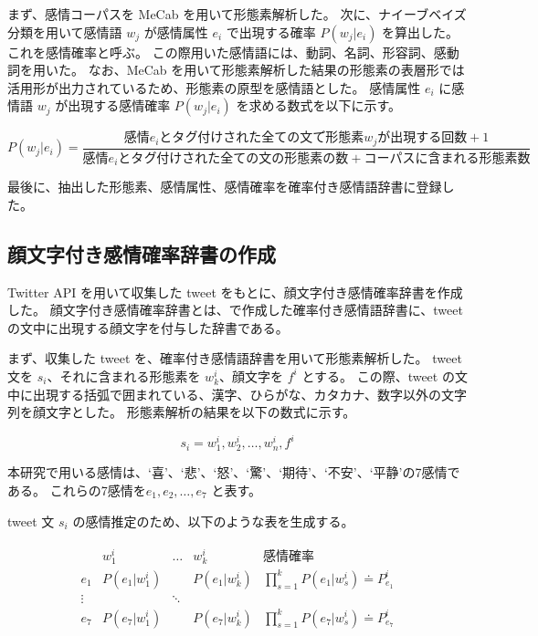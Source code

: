 \documentclass[11pt,a4j]{jsarticle}
\begin{document}
まず、感情コーパスを MeCab を用いて形態素解析した。
次に、ナイーブベイズ分類を用いて感情語 $w_j$ が感情属性 $e_i$ で出現する確率 $P(w_j|e_i)$ を算出した。
これを感情確率と呼ぶ。
この際用いた感情語には、動詞、名詞、形容詞、感動詞を用いた。
なお、MeCab を用いて形態素解析した結果の形態素の表層形では活用形が出力されているため、形態素の原型を感情語とした。
感情属性 $e_i$ に感情語 $w_j$ が出現する感情確率 $P(w_j|e_i)$ を求める数式を以下に示す。

\[
P(w_j|e_i)=\frac{感情 e_i とタグ付けされた全ての文で形態素 w_j が出現する回数 +1}{感情 e_i とタグ付けされた全ての文の形態素の数 + コーパスに含まれる形態素数}
\]

最後に、抽出した形態素、感情属性、感情確率を確率付き感情語辞書に登録した。

  \subsection{顔文字付き感情確率辞書の作成}\label{sec:kaomojidic}
Twitter API を用いて収集した tweet をもとに、顔文字付き感情確率辞書を作成した。
顔文字付き感情確率辞書とは、で作成した確率付き感情語辞書に、tweet の文中に出現する顔文字を付与した辞書である。

まず、収集した tweet を、確率付き感情語辞書を用いて形態素解析した。
tweet 文を $s_i$、それに含まれる形態素を $w^i_k$、顔文字を $f^i$ とする。
この際、tweet の文中に出現する括弧で囲まれている、漢字、ひらがな、カタカナ、数字以外の文字列を顔文字とした。
形態素解析の結果を以下の数式に示す。

\[
s_i=w^i_1,w^i_2,\ldots,w_n^i,f^i
\]

本研究で用いる感情は、`喜'、`悲'、`怒'、`驚'、`期待'、`不安'、`平静'の7感情である。
これらの7感情を$e_1, e_2, \ldots, e_7$ と表す。

tweet 文 $s_i$ の感情推定のため、以下のような表を生成する。

\begin{eqnarray*}
  \begin{array}{r|ccc|l}
        & w^i_1              & \ldots          & w^{i}_{k}    & 感情確率 \\ \hline
    e_1 & P(e_1|w^i_1) &                 & P(e_1|w^i_k) & \prod_{s=1}^{k}P(e_1|w^i_s) \doteq P^i_{e_1}\\
    \vdots             &                 & \ddots       &                                           & \\
    e_7 & P(e_7|w^i_1) &                 & P(e_7|w^i_k) & \prod_{s=1}^{k}P(e_7|w^i_s) \doteq P^i_{e_7}\\
  \end{array}
\end{eqnarray*}
\end{document}
